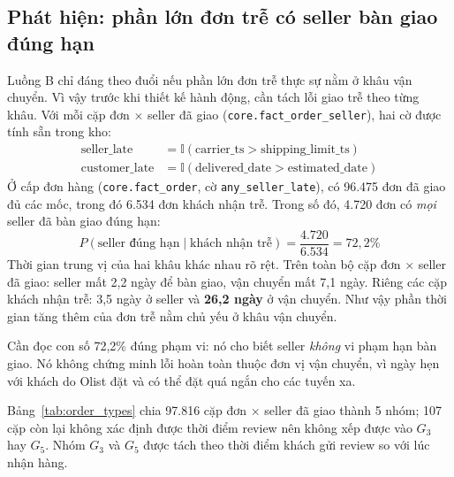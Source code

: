 \subsection{Phát hiện: phần lớn đơn trễ có seller bàn giao đúng hạn}\label{sec:late_finding}
Luồng B chỉ đáng theo đuổi nếu phần lớn đơn trễ thực sự nằm ở khâu vận chuyển. Vì vậy trước khi thiết kế hành động, cần tách lỗi giao trễ theo từng khâu. Với mỗi cặp đơn $\times$ seller đã giao (\texttt{core.fact\_order\_seller}), hai cờ được tính sẵn trong kho:
\begin{align}
\text{seller\_late} &= \mathbb{I}(\text{carrier\_ts} > \text{shipping\_limit\_ts}) \\
\text{customer\_late} &= \mathbb{I}(\text{delivered\_date} > \text{estimated\_date})
\end{align}
Ở cấp đơn hàng (\texttt{core.fact\_order}, cờ \texttt{any\_seller\_late}), có 96.475 đơn đã giao đủ các mốc, trong đó 6.534 đơn khách nhận trễ. Trong số đó, 4.720 đơn có \emph{mọi} seller đã bàn giao đúng hạn:
\begin{equation}
P(\text{seller đúng hạn} \mid \text{khách nhận trễ}) = \frac{4.720}{6.534} = 72{,}2\%
\end{equation}
Thời gian trung vị của hai khâu khác nhau rõ rệt. Trên toàn bộ cặp đơn $\times$ seller đã giao: seller mất 2,2 ngày để bàn giao, vận chuyển mất 7,1 ngày. Riêng các cặp khách nhận trễ: 3,5 ngày ở seller và \textbf{26,2 ngày} ở vận chuyển. Như vậy phần thời gian tăng thêm của đơn trễ nằm chủ yếu ở khâu vận chuyển.

Cần đọc con số 72,2\% đúng phạm vi: nó cho biết seller \emph{không} vi phạm hạn bàn giao. Nó không chứng minh lỗi hoàn toàn thuộc đơn vị vận chuyển, vì ngày hẹn với khách do Olist đặt và có thể đặt quá ngắn cho các tuyến xa.

Bảng~\ref{tab:order_types} chia 97.816 cặp đơn $\times$ seller đã giao thành 5 nhóm; 107 cặp còn lại không xác định được thời điểm review nên không xếp được vào $G_3$ hay $G_5$. Nhóm $G_3$ và $G_5$ được tách theo thời điểm khách gửi review so với lúc nhận hàng.

